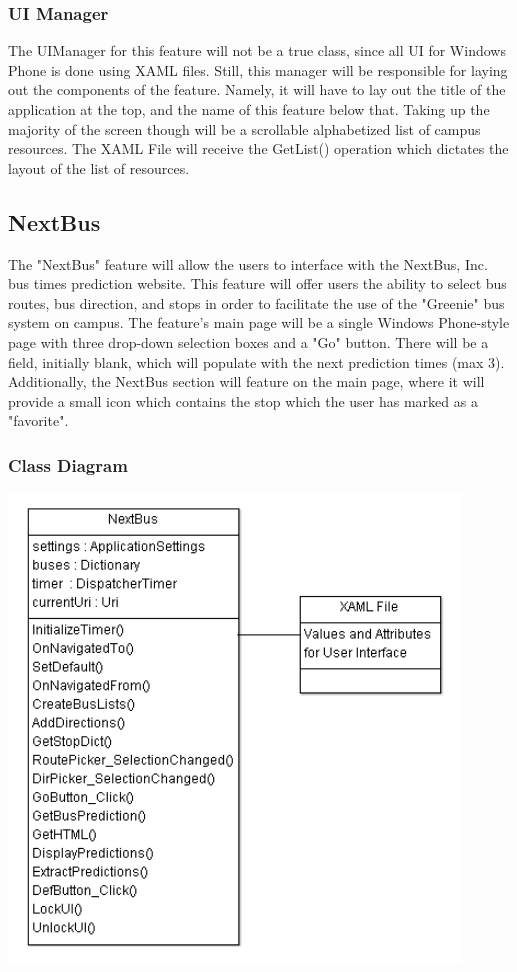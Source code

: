 \documentclass[pdftex,12pt,letter]{article}
\begin{document}
\subsubsection{UI Manager}
The UIManager for this feature will not be a true class, since all UI for Windows Phone is done using XAML files. Still, this manager will be responsible for laying out the components of the feature. Namely, it will have to lay out the title of the application at the top, and the name of this feature below that. Taking up the majority of the screen though will be a scrollable alphabetized list of campus resources. The XAML File will receive the GetList() operation which dictates the layout of the list of resources.
\subsection{NextBus}
The "NextBus" feature will allow the users to interface with the NextBus, Inc. bus times prediction website. This feature will offer users the ability to select bus routes, bus direction, and stops in order to facilitate the use of the "Greenie" bus system on campus. The feature's main page will be a single Windows Phone-style page with three drop-down selection boxes and a "Go" button. There will be a field, initially blank, which will populate with the next prediction times (max 3). Additionally, the NextBus section will feature on the main page, where it will provide a small icon which contains the stop which the user has marked as a "favorite".
\subsubsection{Class Diagram}
\begin{flushleft}
\includegraphics[width=120mm]{nextbusCD.png}
\end{flushleft}
\end{document}
